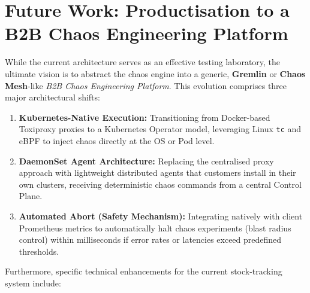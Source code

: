 \documentclass[12pt,a4paper,twoside]{article}
\begin{document}
\section{Future Work: Productisation to a B2B Chaos Engineering Platform}
\label{sec:future}

While the current architecture serves as an effective testing laboratory, the
ultimate vision is to abstract the chaos engine into a generic, \textbf{Gremlin}
or \textbf{Chaos Mesh}-like \emph{B2B Chaos Engineering Platform}. This evolution
comprises three major architectural shifts:

\begin{enumerate}[leftmargin=1.8cm, label=\textbf{V\arabic*.}]
  \item \textbf{Kubernetes-Native Execution:} Transitioning from Docker-based
        Toxiproxy proxies to a Kubernetes Operator model, leveraging Linux \texttt{tc}
        and eBPF to inject chaos directly at the OS or Pod level.
  \item \textbf{DaemonSet Agent Architecture:} Replacing the centralised proxy approach
        with lightweight distributed agents that customers install in their own clusters,
        receiving deterministic chaos commands from a central Control Plane.
  \item \textbf{Automated Abort (Safety Mechanism):} Integrating natively with client
        Prometheus metrics to automatically halt chaos experiments (blast radius control)
        within milliseconds if error rates or latencies exceed predefined thresholds.
\end{enumerate}

Furthermore, specific technical enhancements for the current stock-tracking system include:
\end{document}
